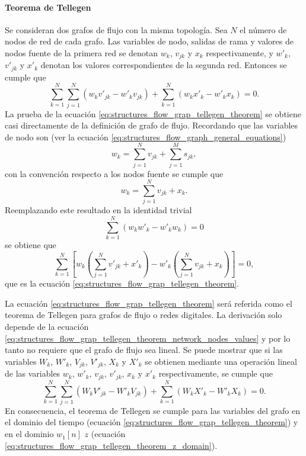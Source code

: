 \documentclass[a4paper]{report}
\begin{document}
\paragraph{Teorema de Tellegen} Se consideran dos grafos de flujo con la misma topología. Sea \(N\) el número de nodos de red de cada grafo. Las variables de nodo, salidas de rama y valores de nodos fuente de la primera red se denotan \(w_k\), \(v_{jk}\) y \(x_k\) respectivamente, y \(w'_k\), \(v'_{jk}\) y \(x'_k\) denotan los valores correspondientes de la segunda red. Entonces se cumple que 
\begin{equation}\label{eq:structures_flow_grap_tellegen_theorem}
 \sum_{k=1}^N\sum_{j=1}^N(w_kv'_{jk}-w'_kv_{jk})+\sum_{k=1}^N(w_kx'_k-w'_kx_k)=0.
\end{equation}
La prueba de la ecuación \ref{eq:structures_flow_grap_tellegen_theorem} se obtiene casi directamente de la definición de grafo de flujo. Recordando que las variables de nodo son (ver la ecuación \ref{eq:structures_flow_graph_general_equations})
\[
 w_k=\sum_{j=1}^N v_{jk}+\sum_{j=1}^M s_{jk},
\]
con la convención respecto a los nodos fuente se cumple que 
\begin{equation}\label{eq:structures_flow_grap_tellegen_theorem_network_nodes_values}
 w_k=\sum_{j=1}^N v_{jk}+x_k. 
\end{equation}
Reemplazando este resultado en la identidad trivial
\[
 \sum_{k=1}^N(w_kw'_k-w'_kw_k)=0
\]
se obtiene que 
\[
 \sum_{k=1}^N\left[w_k\left(\sum_{j=1}^N v'_{jk}+x'_k\right)-w'_k\left(\sum_{j=1}^N v_{jk}+x_k\right)\right]=0,
\]
que es la ecuación \ref{eq:structures_flow_grap_tellegen_theorem}.

La ecuación \ref{eq:structures_flow_grap_tellegen_theorem} será referida como el teorema de Tellegen para grafos de flujo o redes digitales. La derivación solo depende de la ecuación \ref{eq:structures_flow_grap_tellegen_theorem_network_nodes_values} y por lo tanto no requiere que el grafo de flujo sea lineal. Se puede mostrar que si las variables \(W_k\), \(W'_k\), \(V_{jk}\), \(V'_{jk}\), \(X_k\) y \(X'_k\) se obtienen mediante una operación lineal de las variables \(w_k\), \(w'_k\), \(v_{jk}\), \(v'_{jk}\), \(x_k\) y \(x'_k\) respectivamente, se cumple que 
\begin{equation}\label{eq:structures_flow_grap_tellegen_theorem_z_domain}
 \sum_{k=1}^N\sum_{j=1}^N(W_kV'_{jk}-W'_kV_{jk})+\sum_{k=1}^N(W_kX'_k-W'_kX_k)=0.
\end{equation}
En consecuencia, el teorema de Tellegen se cumple para las variables del grafo en el dominio del tiempo (ecuación \ref{eq:structures_flow_grap_tellegen_theorem}) y en el dominio \(w_1[n]\) \(z\) (ecuación \ref{eq:structures_flow_grap_tellegen_theorem_z_domain}).
\end{document}
